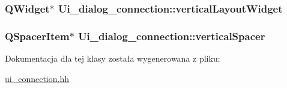 \subsubsection[{\texorpdfstring{vertical\+Layout\+Widget}{verticalLayoutWidget}}]{\setlength{\rightskip}{0pt plus 5cm}Q\+Widget$\ast$ Ui\+\_\+dialog\+\_\+connection\+::vertical\+Layout\+Widget}\hypertarget{class_ui__dialog__connection_a9372f7757af2d883db9a3594661d964a}{}\label{class_ui__dialog__connection_a9372f7757af2d883db9a3594661d964a}
\subsubsection[{\texorpdfstring{vertical\+Spacer}{verticalSpacer}}]{\setlength{\rightskip}{0pt plus 5cm}Q\+Spacer\+Item$\ast$ Ui\+\_\+dialog\+\_\+connection\+::vertical\+Spacer}\hypertarget{class_ui__dialog__connection_ae7e76747f0f818d8554fae2cd745422c}{}\label{class_ui__dialog__connection_ae7e76747f0f818d8554fae2cd745422c}


Dokumentacja dla tej klasy została wygenerowana z pliku\+:\begin{DoxyCompactItemize}
\item 
\hyperlink{ui__connection_8hh}{ui\+\_\+connection.\+hh}\end{DoxyCompactItemize}
